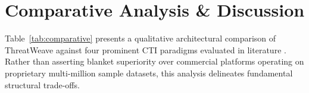 \documentclass[conference]{IEEEtran}
\begin{document}
\begin{table}[htbp]
\caption{System Resource Utilization and Memory Footprint}
\label{tab:rss}
\centering
{}
\end{table}

\section{Comparative Analysis \& Discussion}
Table~\ref{tab:comparative} presents a qualitative architectural comparison of ThreatWeave against four prominent CTI paradigms evaluated in literature \cite{xiang2011cantina, marchal2014phishstorm, boukari2021smishing, abdelnabi2020visualphishnet, wang2024surveyagents, nist80030r1, lewis2020rag}. Rather than asserting blanket superiority over commercial platforms operating on proprietary multi-million sample datasets, this analysis delineates fundamental structural trade-offs.
\end{document}
